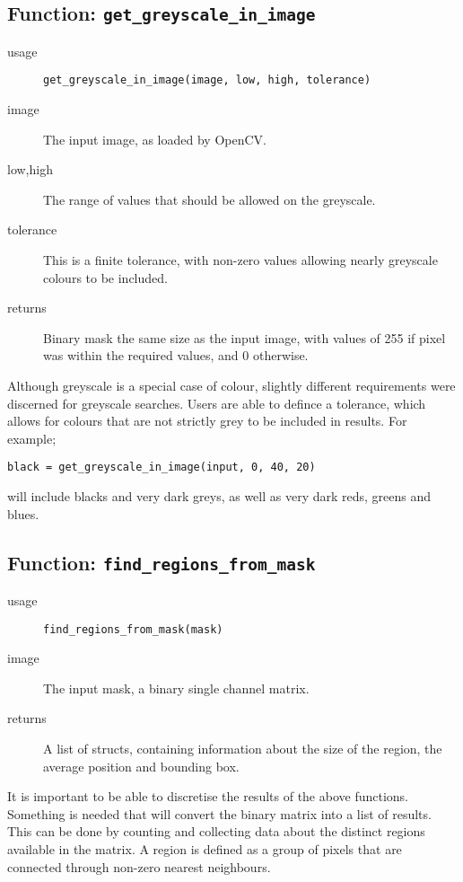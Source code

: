\documentclass[../main.tex]{subfiles}
\begin{document}
  \subsection{Function: \texttt{get\_greyscale\_in\_image}} 
    \begin{description}
      \item[usage] \texttt{get\_greyscale\_in\_image(image, low, high, tolerance)}
      \item[image] The input image, as loaded by OpenCV.
      \item[low,high] The range of values that should be allowed on the greyscale.
      \item[tolerance] This is a finite tolerance, with non-zero values allowing nearly greyscale colours to be included.
      \item[returns] Binary mask the same size as the input image, with values of 255 if pixel was within the required values, and 0 otherwise.
    \end{description}
    Although greyscale is a special case of colour, slightly different requirements were discerned for greyscale searches.
    Users are able to defince a tolerance, which allows for colours that are not strictly grey to be included in results.
    For example; 
    \begin{center}
      \texttt{black = get\_greyscale\_in\_image(input, 0, 40, 20)}
    \end{center}
    will include blacks and very dark greys, as well as very dark reds, greens and blues.
  \subsection{Function: \texttt{find\_regions\_from\_mask}} 
    \begin{description}
      \item[usage] \texttt{find\_regions\_from\_mask(mask)}
      \item[image] The input mask, a binary single channel matrix.
      \item[returns] A list of structs, containing information about the size of the region, the average position and bounding box.
    \end{description}
    It is important to be able to discretise the results of the above functions.
    Something is needed that will convert the binary matrix into a list of results.
    This can be done by counting and collecting data about the distinct regions available in the matrix.
    A region is defined as a group of pixels that are connected through non-zero nearest neighbours.
  
\end{document}
